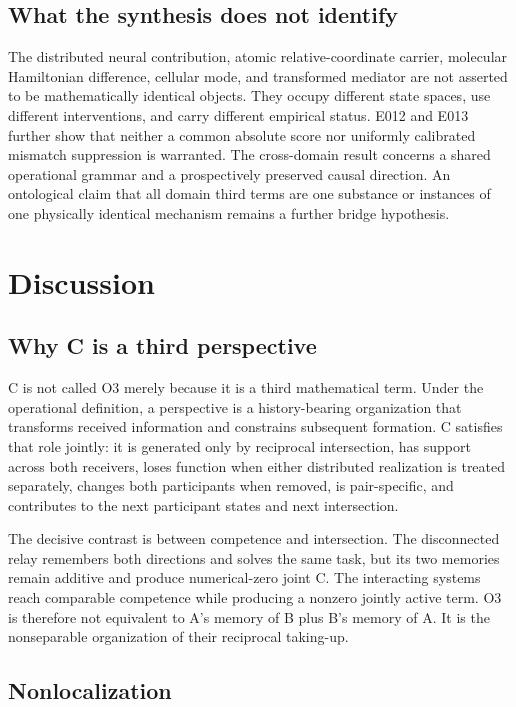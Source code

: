 \documentclass[11pt,a4paper]{article}
\begin{document}
\subsection{What the synthesis does not identify}

The distributed neural contribution, atomic relative-coordinate carrier, molecular Hamiltonian difference, cellular mode, and transformed mediator are not asserted to be mathematically identical objects. They occupy different state spaces, use different interventions, and carry different empirical status. E012 and E013 further show that neither a common absolute score nor uniformly calibrated mismatch suppression is warranted. The cross-domain result concerns a shared operational grammar and a prospectively preserved causal direction. An ontological claim that all domain third terms are one substance or instances of one physically identical mechanism remains a further bridge hypothesis.

\section{Discussion}

\subsection{Why C is a third perspective}

C is not called O3 merely because it is a third mathematical term. Under the operational definition, a perspective is a history-bearing organization that transforms received information and constrains subsequent formation. C satisfies that role jointly: it is generated only by reciprocal intersection, has support across both receivers, loses function when either distributed realization is treated separately, changes both participants when removed, is pair-specific, and contributes to the next participant states and next intersection.

The decisive contrast is between competence and intersection. The disconnected relay remembers both directions and solves the same task, but its two memories remain additive and produce numerical-zero joint C. The interacting systems reach comparable competence while producing a nonzero jointly active term. O3 is therefore not equivalent to A's memory of B plus B's memory of A. It is the nonseparable organization of their reciprocal taking-up.

\subsection{Nonlocalization}
\end{document}

